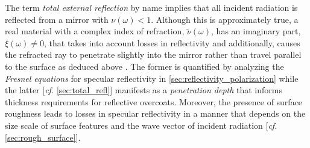 The term \emph{total external reflection} by name implies that all incident radiation is reflected from a mirror with $\nu (\omega) < 1$. 
Although this is approximately true, a real material with a complex index of refraction, $\tilde{\nu} (\omega)$, has an imaginary part, $\xi(\omega) \neq 0$, that takes into account losses in reflectivity and additionally, causes the refracted ray to penetrate slightly into the mirror rather than travel parallel to the surface as deduced above \cite{Attwood17}. 
The former is quantified by analyzing the \emph{Fresnel equations} for specular reflectivity in \cref{sec:reflectivity_polarization} while the latter [\emph{cf.\@} \cref{sec:total_refl}] manifests as a \emph{penetration depth} that informs thickness requirements for reflective overcoats. 
Moreover, the presence of surface roughness leads to losses in specular reflectivity in a manner that depends on the size scale of surface features and the wave vector of incident radiation [\emph{cf.\@} \cref{sec:rough_surface}]. %

